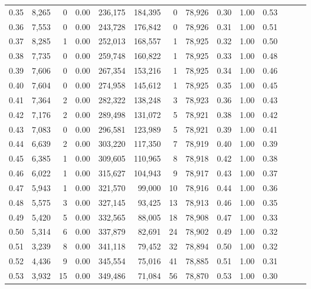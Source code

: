 \begin{tabular}{rrrrrrrrrrrrrr}
0.35 &  8,265 &      0 &  0.00 &  236,175 &  184,395 &       0 &  78,926 &  0.30 &  1.00 &      0.53 \\
0.36 &  7,553 &      0 &  0.00 &  243,728 &  176,842 &       0 &  78,926 &  0.31 &  1.00 &      0.51 \\
0.37 &  8,285 &      1 &  0.00 &  252,013 &  168,557 &       1 &  78,925 &  0.32 &  1.00 &      0.50 \\
0.38 &  7,735 &      0 &  0.00 &  259,748 &  160,822 &       1 &  78,925 &  0.33 &  1.00 &      0.48 \\
0.39 &  7,606 &      0 &  0.00 &  267,354 &  153,216 &       1 &  78,925 &  0.34 &  1.00 &      0.46 \\
0.40 &  7,604 &      0 &  0.00 &  274,958 &  145,612 &       1 &  78,925 &  0.35 &  1.00 &      0.45 \\
0.41 &  7,364 &      2 &  0.00 &  282,322 &  138,248 &       3 &  78,923 &  0.36 &  1.00 &      0.43 \\
0.42 &  7,176 &      2 &  0.00 &  289,498 &  131,072 &       5 &  78,921 &  0.38 &  1.00 &      0.42 \\
0.43 &  7,083 &      0 &  0.00 &  296,581 &  123,989 &       5 &  78,921 &  0.39 &  1.00 &      0.41 \\
0.44 &  6,639 &      2 &  0.00 &  303,220 &  117,350 &       7 &  78,919 &  0.40 &  1.00 &      0.39 \\
0.45 &  6,385 &      1 &  0.00 &  309,605 &  110,965 &       8 &  78,918 &  0.42 &  1.00 &      0.38 \\
0.46 &  6,022 &      1 &  0.00 &  315,627 &  104,943 &       9 &  78,917 &  0.43 &  1.00 &      0.37 \\
0.47 &  5,943 &      1 &  0.00 &  321,570 &   99,000 &      10 &  78,916 &  0.44 &  1.00 &      0.36 \\
0.48 &  5,575 &      3 &  0.00 &  327,145 &   93,425 &      13 &  78,913 &  0.46 &  1.00 &      0.35 \\
0.49 &  5,420 &      5 &  0.00 &  332,565 &   88,005 &      18 &  78,908 &  0.47 &  1.00 &      0.33 \\
0.50 &  5,314 &      6 &  0.00 &  337,879 &   82,691 &      24 &  78,902 &  0.49 &  1.00 &      0.32 \\
0.51 &  3,239 &      8 &  0.00 &  341,118 &   79,452 &      32 &  78,894 &  0.50 &  1.00 &      0.32 \\
0.52 &  4,436 &      9 &  0.00 &  345,554 &   75,016 &      41 &  78,885 &  0.51 &  1.00 &      0.31 \\
0.53 &  3,932 &     15 &  0.00 &  349,486 &   71,084 &      56 &  78,870 &  0.53 &  1.00 &      0.30 \\

\end{tabular}
